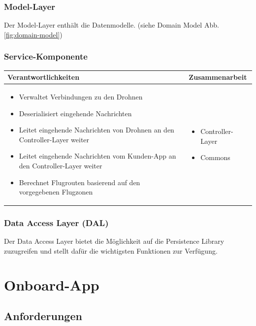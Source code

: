\subsubsection{Model-Layer}

Der Model-Layer enthält die Datenmodelle. (siehe Domain Model Abb. \ref{fig:domain-model})

\subsubsection{Service-Komponente}

\begin{tabular}{|p{}|p{}|} \hline
	\textbf{Verantwortlichkeiten} & \textbf{Zusammenarbeit} \\ \hline \hline
	
	\begin{itemize}
		\item Verwaltet Verbindungen zu den Drohnen
		\item Deserialisiert eingehende Nachrichten
		\item Leitet eingehende Nachrichten von Drohnen an den Controller-Layer weiter	
		\item Leitet eingehende Nachrichten vom Kunden-App an den Controller-Layer weiter	
		\item Berechnet Flugrouten basierend auf den vorgegebenen Flugzonen
	\end{itemize}&
	\begin{itemize}
		\item Controller-Layer
		\item Commons
	\end{itemize}
	\\ \hline
\end{tabular}

\subsubsection{Data Access Layer (DAL)}

Der Data Access Layer bietet die Möglichkeit auf die Persistence Library zuzugreifen und stellt dafür die wichtigsten Funktionen zur Verfügung. 

\section{Onboard-App}

\subsection{Anforderungen}

